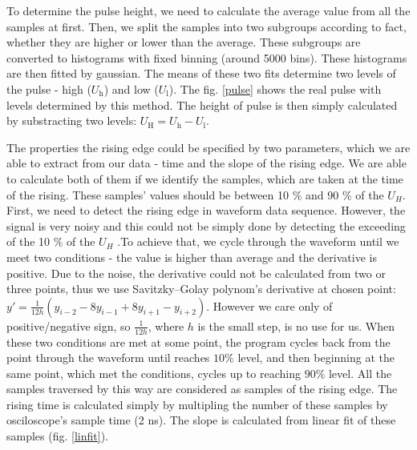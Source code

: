 To determine the pulse height, we need to calculate the average value from all the samples at first. Then, we split the samples into two subgroups according to fact, whether they are higher or lower than the average. These subgroups are converted to histograms with fixed binning (around 5000 bins). These histograms are then fitted by gaussian. The means of these two fits determine two levels of the pulse - high ($U_\textrm{h}$) and low ($U_\textrm{l}$). The fig. \ref{pulse} shows the real pulse with levels determined by this method. The height of pulse is then simply calculated by substracting two levels: $U_\textrm{H} = U_\textrm{h} - U_\textrm{l}$.

\par
The properties the rising edge could be specified by two parameters, which we are able to extract from our data - time and the slope of the rising edge. We are able to calculate both of them if we identify the samples, which are taken at the time of the rising. These samples' values should be between 10 $\%$ and 90 $\%$ of the $U_{H}$. First, we need to detect the rising edge in waveform data sequence. However, the signal is very noisy and this could not be simply done by detecting the exceeding of the 10 $\%$ of the $U_{H}$ .To achieve that, we cycle through the waveform until we meet two conditions - the value is higher than average and the derivative is positive. Due to the noise, the derivative could not be calculated from two or three points, thus we use Savitzky–Golay polynom's derivative at chosen point: $y' = \frac{1}{12h}(y_{i-2} -8y_{i-1} + 8y_{i+1} - y_{i+2}) $. However we care only of positive/negative sign, so $\frac{1}{12h}$, where $h$ is the small step, is no use for us. When these two conditions are met at some point, the program cycles back from the point through the waveform until reaches $10\%$ level, and then beginning at the same point, which met the conditions, cycles up to reaching $90\%$ level. All the samples traversed by this way are considered as samples of the rising edge. The rising time is calculated simply by multipling the number of these samples by osciloscope's sample time (2 ns). The slope is calculated from linear fit of these samples (fig. \ref{linfit}).  


